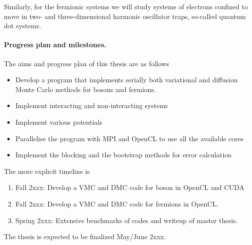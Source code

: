 \documentclass[%
oneside,                 %
final,                   %
10pt]{article}
\begin{document}
Similarly, for the fermionic systems we will study systems of electrons confined to move in two- and three-dimensional harmonic oscillator traps, so-called quantum dot systems.


\paragraph{Progress plan and milestones.}
The aims and progress plan of this thesis are as follows

\begin{itemize}
\item Develop a program that implements serially both variational and diffusion Monte Carlo methods for bosons and fermions.

\item Implement interacting and non-interacting systems

\item Implement various potentials

\item Parallelise the program with MPI and OpenCL to use all the available cores

\item Implement the blocking and the bootstrap methods  for error calculation
\end{itemize}

\noindent
The more explicit timeline is 

\begin{enumerate}
 \item Fall 2xxx: Develop a VMC and DMC code for boson in OpenCL and CUDA

 \item Fall 2xxx: Develop a VMC and DMC  code for fermions in OpenCL.

 \item Spring 2xxx: Extensive benchmarks of codes and writeup of master thesis.
\end{enumerate}

\noindent
The thesis is expected to be finalized May/June 2xxx.

















\end{document}
